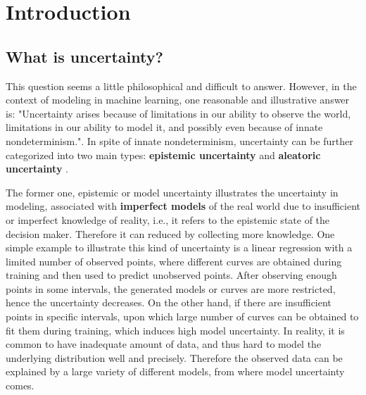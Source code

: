 \chapter{Introduction}
\setcounter{page}{1}%
\thispagestyle{empty}

\section{What is uncertainty?}
This question seems a little philosophical and difficult to answer. However, in the context of modeling in machine learning, one reasonable and illustrative answer is: "Uncertainty arises because of limitations in our ability to observe the world, limitations in our ability to model it, and possibly even because of innate nondeterminism."\cite{koller2009probabilistic}. In spite of innate nondeterminism, uncertainty can be further categorized into two main types: \textbf{epistemic uncertainty} and \textbf{aleatoric uncertainty} \cite{der2009aleatory, senge2014reliable, kendall2017uncertainties}. 

The former one, epistemic or model uncertainty illustrates the uncertainty in modeling, associated with \textbf{imperfect models} of the real world due to insufficient or imperfect knowledge of reality, i.e., it refers to the epistemic state of the decision maker.
Therefore it can reduced by collecting more knowledge. %
One simple example to illustrate this kind of uncertainty is a linear regression with a limited number of observed points, where different curves are obtained during training and then used to predict unobserved points. After observing enough points in some intervals, the generated models or curves are more restricted, hence the uncertainty decreases. On the other hand, if there are insufficient points in specific intervals, upon which large number of curves can be obtained to fit them during training, which induces high model uncertainty.  In reality, it is common to have inadequate amount of data, and thus hard to model the underlying distribution well and precisely. Therefore the observed data can be explained by a large variety of different models, from where model uncertainty comes.


